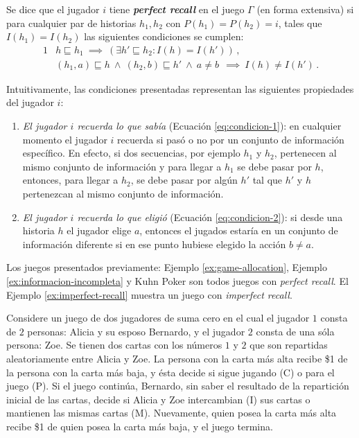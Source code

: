 \begin{definition}
\label{def:perfect-recall}
Se dice que el jugador $i$ tiene \textbf{\textit{perfect recall}} en el juego $\Gamma$ (en forma extensiva) si para cualquier par de historias $h_1, h_2$ con $P(h_1) = P(h_2) = i$, tales que $I(h_1) = I(h_2)$ las siguientes condiciones se cumplen:
\begin{alignat}{1}
& h \sqsubseteq h_1\ \implies\ (\exists h' \sqsubseteq h_2 : I(h) = I(h')) \,,
\label{eq:condicion-1}\\
& (h_1, a) \sqsubseteq h\  \land\ (h_2, b)\sqsubseteq h'\ \land\ a \neq b\ \  \implies\ I(h) \neq I(h') \,.
\label{eq:condicion-2}
\end{alignat}
\end{definition}

Intuitivamente, las condiciones presentadas representan las siguientes propiedades del jugador $i$:
\begin{enumerate}[noitemsep]
\item \textit{El jugador $i$ recuerda lo que sabía} (Ecuación \ref{eq:condicion-1}): en cualquier momento el jugador $i$ recuerda si pasó o no por un conjunto de información específico. En efecto, si dos secuencias, por ejemplo $h_1$ y $h_2$, pertenecen al mismo conjunto de información y para llegar a $h_1$ se debe pasar por $h$, entonces, para llegar a $h_2$, se debe pasar por algún $h'$ tal que $h'$ y $h$ pertenezcan al mismo conjunto de información. 

\item \textit{El jugador $i$ recuerda lo que eligió} (Ecuación \ref{eq:condicion-2}): si desde una historia $h$ el jugador elige $a$, entonces el jugados estaría  en un conjunto de información diferente si en ese punto hubiese elegido la acción $b \neq a$.
\end{enumerate}

Los juegos presentados previamente: Ejemplo \ref{ex:game-allocation}, Ejemplo \ref{ex:informacion-incompleta} y Kuhn Poker son todos juegos con \textit{perfect recall}. El Ejemplo \ref{ex:imperfect-recall} muestra un juego con \textit{imperfect recall}.

\begin{example}
\label{ex:imperfect-recall}
Considere un juego de dos jugadores de suma cero en el cual el jugador $1$ consta de $2$ personas: Alicia y su esposo Bernardo, y el jugador $2$ consta de una sóla persona: Zoe. Se tienen dos cartas con los números $1$ y $2$ que son repartidas aleatoriamente entre Alicia y Zoe. La persona con la carta más alta recibe \$1 de la persona con la carta más baja, y ésta decide si sigue jugando (C) o para el juego (P). Si el juego continúa, Bernardo, sin saber el resultado de la repartición inicial de las cartas, decide si Alicia y Zoe intercambian (I) sus cartas o mantienen las mismas cartas (M). Nuevamente, quien posea la carta más alta recibe \$1 de quien posea la carta más baja, y el juego termina.
\end{example}

